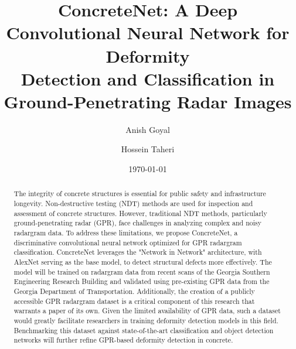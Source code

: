 \documentclass[pra, superscriptaddress]{revtex4-2}
\begin{document}

\title{ConcreteNet: A Deep Convolutional Neural Network for Deformity \\ Detection and Classification in Ground-Penetrating Radar Images}

\date{\today}

\author{Anish Goyal}

\author{Hossein Taheri}

\begin{abstract}
The integrity of concrete structures is essential for public safety and infrastructure longevity. Non-destructive testing (NDT) methods are used for inspection and assessment of concrete structures. However, traditional NDT methods, particularly ground-penetrating radar (GPR), face challenges in analyzing complex and noisy radargram data. To address these limitations, we propose ConcreteNet, a discriminative convolutional neural network optimized for GPR radargram classification. ConcreteNet leverages the "Network in Network" architecture, with AlexNet serving as the base model, to detect structural defects more effectively. The model will be trained on radargram data from recent scans of the Georgia Southern Engineering Research Building and validated using pre-existing GPR data from the Georgia Department of Transportation. Additionally, the creation of a publicly accessible GPR radargram dataset is a critical component of this research that warrants a paper of its own. Given the limited availability of GPR data, such a dataset would greatly facilitate researchers in training deformity detection models in this field. Benchmarking this dataset against state-of-the-art classification and object detection networks will further refine GPR-based deformity detection in concrete.
\end{abstract}

\end{document}
